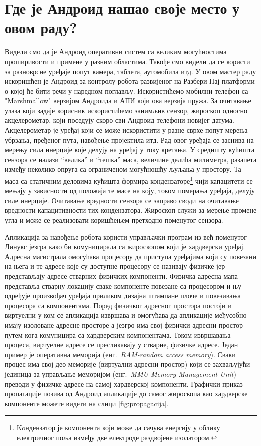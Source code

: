 \documentclass[12pt,oneside]{memoir}
\theoremstyle{remark}
\begin{document}
\section{Где је Андроид нашао своје место у овом раду?}
Видели смо да је Андроид оперативни систем са великим могућностима проширивости и примене у разним областима. Такође смо видели да се користи за разноврсне уређаје попут камера, таблета, аутомобила итд. У овом мастер раду искоришћен је Андроид за контролу робота развијеног на Разбери Пај платформи о којој ће бити речи у наредном поглављу. 
Искористићемо мобилни телефон са "Marshmallow" верзијом Андроида и АПИ који ова верзија пружа. За очитавање улаза који задаје корисник искористићемо занимљив сензор,  жироскоп односно акцелерометар, који поседују скоро сви Андроид телефони новијег датума. Акцелерометар је уређај који се може искористити у разне сврхе попут мерења убрзања, пређеног пута, навођење пројектила итд. Рад овог уређаја се заснива на мерењу сила инерције које делују на уређај у току кретања. У средишту кућишта сензора се налази \enquote{велика} и \enquote{тешка} маса, величине делића милиметра, разапета између неколико опруга са ограниченом могућношћу љуљања у простору. Та маса са статичним деловима кућишта формира кондензаторе\footnote{Koндензатор је компонента који може да сачува енергију у облику електричног поља између две електроде раздвојене изолатором.} чији капацитети се мењају у зависности од положаја те масе на коју, током померања уређаја, делују силе инерције. Очитавање вредности сензора се заправо своди на очитавање вредности капацитивности тих кондензатора. Жироскоп служи за мерење промене угла и може се реализовати коришћењем претходно поменутог сензора.

Апликација за навођење робота користи управљачки програм из већ поменутог Линукс језгра како би комуницирала са жироскопом који је хардверски уређај. Адресна магистрала омогућава процесору да приступа уређајима који су повезани на њега и те адресе које су доступне процесору се називају физичке јер представљају адресе стварних физичких компоненти. Физичка адресна мапа представља  стварну локацију сваке компоненте повезане са процесором и њу одређује произвођач уређаја приликом дизајна штампане плоче и повезивања процесора са компонентама. Поред физичког адресног простора постоји и виртуелни у ком се апликација извршава и омогућава да апликације међусобно имају изоловане адресне просторе а језгро има свој физички адресни простор путем кога комуницира са хардверским компонентама. Током извршавања процеса, виртуелне адресе се пресликавају у стварне, физичке адресе. Један пример је оперативна меморија (енг.~{\em RAM-random access memory}). Сваки процес има свој део меморије (виртуални адресни простор) који се захваљујући јединица за управљање меморијом (енг.~{\em MMU-Memory Management Unit}) преводи у физичке адресе на самој хардверској компоненти. Графички приказ пропагације позива од Андроид апликације до самог жироскопа као хардверске компоненте можете видети на слици \ref{fig:propagacija}.
\end{document}
